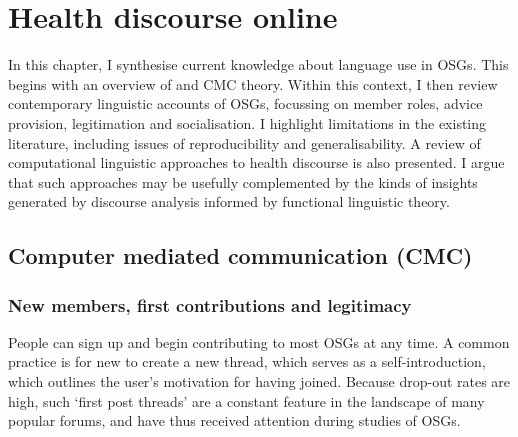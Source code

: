 
\chapter{Health discourse online} \label{chap:onlinehealth}

In this chapter, I synthesise current knowledge about language use in \glspl{OSG}. This begins with an overview of  and \gls{CMC} theory. Within this context, I then review contemporary linguistic accounts of \glspl{OSG}, focussing on member roles, advice provision, legitimation and socialisation. I highlight limitations in the existing literature, including issues of reproducibility and generalisability. A review of computational linguistic approaches to health discourse is also presented. I argue that such approaches may be usefully complemented by the kinds of insights generated by discourse analysis informed by functional linguistic theory. 

\section{Computer mediated communication (CMC)}


%







\subsection{New members, first contributions and legitimacy} \label{sect:newmembers}

People can sign up and begin contributing to most \glspl{OSG} at any time. A common practice is for new  to create a new \gls{thread}, which serves as a self\hyp{}introduction, which outlines the user's motivation for having joined. Because drop\hyp{}out rates are high, such `first \gls{post} \glspl{thread}' are a constant feature in the landscape of many popular \glspl{forum}, and have thus received attention during studies of \glspl{OSG}.

